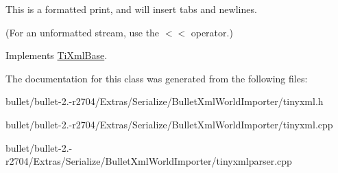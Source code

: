 This is a formatted print, and will insert tabs and newlines.

(For an unformatted stream, use the $<$$<$ operator.) 

Implements \hyperlink{class_ti_xml_base_a0de56b3f2ef14c65091a3b916437b512}{Ti\+Xml\+Base}.



The documentation for this class was generated from the following files\+:\begin{DoxyCompactItemize}
\item 
bullet/bullet-\/2.-\/r2704/\+Extras/\+Serialize/\+Bullet\+Xml\+World\+Importer/tinyxml.\+h\item 
bullet/bullet-\/2.-\/r2704/\+Extras/\+Serialize/\+Bullet\+Xml\+World\+Importer/tinyxml.\+cpp\item 
bullet/bullet-\/2.-\/r2704/\+Extras/\+Serialize/\+Bullet\+Xml\+World\+Importer/tinyxmlparser.\+cpp\end{DoxyCompactItemize}
